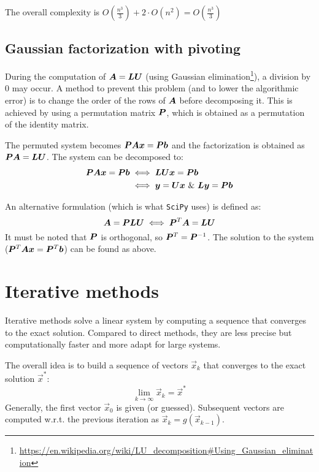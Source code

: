 The overall complexity is $O(\frac{n^3}{3}) + 2 \cdot O(n^2) = O(\frac{n^3}{3})$

\subsection{Gaussian factorization with pivoting}
During the computation of ${\bm{A}} = {\bm{L}}{\bm{U}}$ 
(using Gaussian elimination\footnote{\url{https://en.wikipedia.org/wiki/LU\_decomposition\#Using\_Gaussian\_elimination}}), 
a division by 0 may occur.
A method to prevent this problem (and to lower the algorithmic error) is to change the order of the rows of ${\bm{A}}$ before decomposing it.
This is achieved by using a permutation matrix ${\bm{P}}$, which is obtained as a permutation of the identity matrix.

The permuted system becomes ${\bm{P}}{\bm{A}}{\bm{x}} = {\bm{P}}{\bm{b}}$ and the factorization is obtained as ${\bm{P}}{\bm{A}} = {\bm{L}}{\bm{U}}$.
The system can be decomposed to:
\begin{equation}
    \begin{split}
        {\bm{P}}{\bm{A}}{\bm{x}} = {\bm{P}}{\bm{b}} & \iff {\bm{L}}{\bm{U}}{\bm{x}} = {\bm{P}}{\bm{b}} \\
            & \iff {\bm{y}} = {\bm{U}}{\bm{x}} \text{ \& } {\bm{L}}{\bm{y}} = {\bm{P}}{\bm{b}}
    \end{split}
\end{equation}

An alternative formulation (which is what \texttt{SciPy} uses) 
is defined as:
\[{\bm{A}} = {\bm{P}}{\bm{L}}{\bm{U}} \iff {\bm{P}}^T{\bm{A}} = {\bm{L}}{\bm{U}} \]
It must be noted that ${\bm{P}}$ is orthogonal, so ${\bm{P}}^T = {\bm{P}}^{-1}$.
The solution to the system (${\bm{P}}^T{\bm{A}}{\bm{x}} = {\bm{P}}^T{\bm{b}}$) can be found as above.



\section{Iterative methods}
Iterative methods solve a linear system by computing a sequence that converges to the exact solution.
Compared to direct methods, they are less precise but computationally faster and more adapt for large systems. 

The overall idea is to build a sequence of vectors $\vec{x}_k$ 
that converges to the exact solution $\vec{x}^*$:
\[ \lim_{k \rightarrow \infty} \vec{x}_k = \vec{x}^* \]
Generally, the first vector $\vec{x}_0$ is given (or guessed). Subsequent vectors are computed w.r.t. the previous iteration 
as $\vec{x}_k = g(\vec{x}_{k-1})$.

